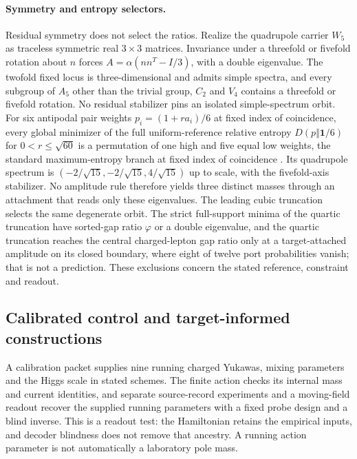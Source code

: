 \documentclass[11pt]{article}
\begin{document}
\paragraph{Symmetry and entropy selectors.}
Residual symmetry does not select the ratios. Realize the quadrupole carrier
\(W_5\) as traceless symmetric real \(3\times3\) matrices. Invariance under a
threefold or fivefold rotation about \(n\) forces \(A=\alpha(nn^T-I/3)\),
with a double eigenvalue. The twofold fixed locus is three-dimensional and
admits simple spectra, and every subgroup of \(A_5\) other than the trivial
group, \(C_2\) and \(V_4\) contains a threefold or fivefold rotation. No
residual stabilizer pins an isolated simple-spectrum orbit. For six antipodal
pair weights \(p_i=(1+ra_i)/6\) at fixed index of coincidence, every global
minimizer of the full uniform-reference relative entropy
\(D(p\Vert\mathbf1/6)\) for \(0<r\le\sqrt{60}\) is a permutation of one high
and five equal low weights, the standard maximum-entropy branch at fixed
index of coincidence \cite{harremoesTopsoe2001}. Its quadrupole spectrum is
\((-2/\sqrt{15},-2/\sqrt{15},4/\sqrt{15})\) up to scale, with the
fivefold-axis stabilizer. No amplitude rule therefore yields three distinct
masses through an attachment that reads only these eigenvalues. The leading
cubic truncation selects the same degenerate orbit. The strict full-support
minima of the quartic truncation have sorted-gap ratio \(\varphi\) or a
double eigenvalue, and the quartic truncation reaches the central charged-lepton gap ratio only at a target-attached
amplitude on its closed boundary, where eight of twelve port probabilities
vanish; that is not a prediction. These exclusions concern the stated
reference, constraint and readout.

\subsection{Calibrated control and target-informed constructions}
\label{sec:calibrated-control}

A calibration packet supplies nine running charged Yukawas, mixing
parameters and the Higgs scale in stated schemes. The finite action checks
its internal mass and current identities, and separate source-record
experiments and a moving-field readout recover the supplied running
parameters with a fixed probe design and a blind inverse. This is a readout
test: the Hamiltonian retains the empirical inputs, and decoder blindness
does not remove that ancestry. A running action parameter is not
automatically a laboratory pole mass.
\end{document}
